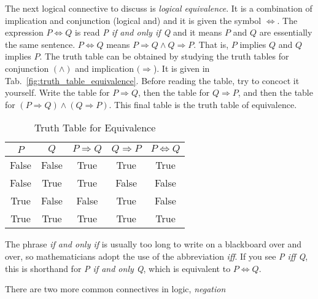             \par\hfill\par
            The next logical connective to discuss is
            \textit{logical equivalence}. It is a combination of implication
            and conjunction (logical and) and it is given the symbol
            $\Leftrightarrow$. The expression $P\Leftrightarrow{Q}$ is read
            \textit{P if and only if Q} and it means $P$ and $Q$ are essentially
            the same sentence. $P\Leftrightarrow{Q}$ means
            $P\Rightarrow{Q}\land{Q}\Rightarrow{P}$. That is,
            $P$ implies $Q$ and $Q$ implies $P$. The truth table can be obtained
            by studying the truth tables for conjunction $(\land)$ and
            implication $(\Rightarrow$). It is given in
            Tab.~\ref{fig:truth_table_equivalence}. Before reading the table,
            try to concoct it yourself. Write the table for $P\Rightarrow{Q}$,
            then the table for $Q\Rightarrow{P}$, and then the table for
            $(P\Rightarrow{Q})\land(Q\Rightarrow{P})$. This final table is the
            truth table of equivalence.
            \begin{table}[H]
                \centering
                \begin{tabular}{c | c | c | c | c}
                    $P$&$Q$&$P\Rightarrow{Q}$&
                        $Q\Rightarrow{P}$&$P\Leftrightarrow{Q}$\\
                    \hline
                    False&False&True&True&True\\
                    \hline
                    False&True&True&False&False\\
                    \hline
                    True&False&False&True&False\\
                    \hline
                    True&True&True&True&True
                \end{tabular}
                \caption{Truth Table for Equivalence}
                \label{tab:truth_table_equivalence}
            \end{table}
            The phrase \textit{if and only if} is usually too long to write on
            a blackboard over and over, so mathematicians adopt the use of the
            abbreviation \textit{iff}. If you see \textit{P iff Q}, this is
            shorthand for \textit{P if and only Q}, which is equivalent to
            $P\Leftrightarrow{Q}$.
            \par\hfill\par
            There are two more common connectives in logic, \textit{negation}
